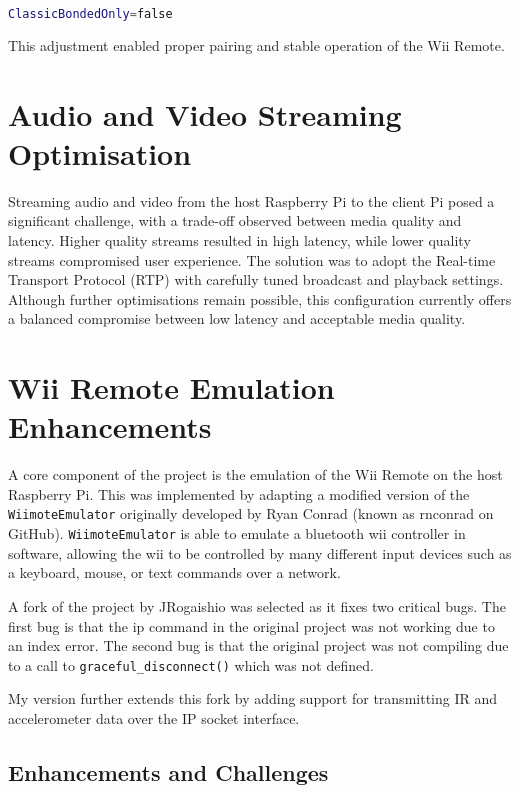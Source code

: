 \begin{lstlisting}[language=bash]
ClassicBondedOnly=false
\end{lstlisting}

This adjustment enabled proper pairing and stable operation of the Wii Remote.

\section{Audio and Video Streaming Optimisation}
Streaming audio and video from the host Raspberry Pi to the client Pi posed a significant challenge, with a trade-off observed between media quality and latency. Higher quality streams resulted in high latency, while lower quality streams compromised user experience. The solution was to adopt the Real-time Transport Protocol (RTP) with carefully tuned broadcast and playback settings. Although further optimisations remain possible, this configuration currently offers a balanced compromise between low latency and acceptable media quality.


\section{Wii Remote Emulation Enhancements}

A core component of the project is the emulation of the Wii Remote on the host Raspberry Pi. This was implemented by adapting a modified version of the \texttt{WiimoteEmulator} originally developed by Ryan Conrad\cite{wiimote_emulator} (known as rnconrad on GitHub). \texttt{WiimoteEmulator} is able to emulate a bluetooth wii controller in software, allowing the wii to be controlled by many different input devices such as a keyboard, mouse, or text commands over a network.

A fork of the project by JRogaishio\cite{jr_wiimote_emu} was selected as it fixes two critical bugs. The first
bug is that the ip command in the original project was not working due to an index error. The second bug is that the original project was not compiling due to a call to \texttt{graceful\_disconnect()} which was not defined.

My version\cite{kf_wiimote_emu} further extends this fork by adding support for transmitting IR and accelerometer data over the IP socket interface.

\subsection{Enhancements and Challenges}

